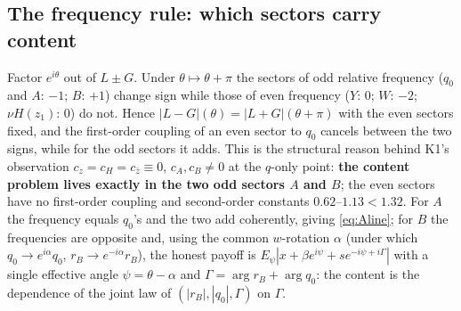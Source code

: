 \subsection{The frequency rule: which sectors carry content}\label{sec:freqrule}
Factor $e^{i\theta}$ out of $L\pm G$. Under $\theta\mapsto\theta+\pi$ the sectors of odd relative frequency ($q_0$ and $A$: $-1$; $B$: $+1$) change sign while those of even
frequency ($Y$: $0$; $W$: $-2$; $\nu H(z_1)$: $0$) do not. Hence $|L-G|(\theta)=|L+G|(\theta+\pi)$ with the even sectors fixed, and the first-order coupling of an even sector to
$q_0$ cancels between the two signs, while for the odd sectors it adds. This is the structural reason behind K1's observation $c_z=c_H=c_{\bar z}\equiv0$, $c_A,c_B\neq0$ at the $q$-only
point: \textbf{the content problem lives exactly in the two odd sectors $A$ and $B$}; the even sectors have no first-order coupling and second-order constants $0.62$--$1.13<1.32$.
For $A$ the frequency equals $q_0$'s and the two add coherently, giving \eqref{eq:Aline}; for $B$ the frequencies are opposite and, using the common $w$-rotation $\alpha$
(under which $q_0\to e^{i\alpha}q_0$, $r_B\to e^{-i\alpha}r_B$), the honest payoff is $E_\psi|x+\beta e^{i\psi}+se^{-i\psi+i\Gamma}|$ with a single effective angle $\psi=\theta-\alpha$ and
$\Gamma=\arg r_B+\arg q_0$: the content is the dependence of the joint law of $(|r_B|,|q_0|,\Gamma)$ on $\Gamma$.

